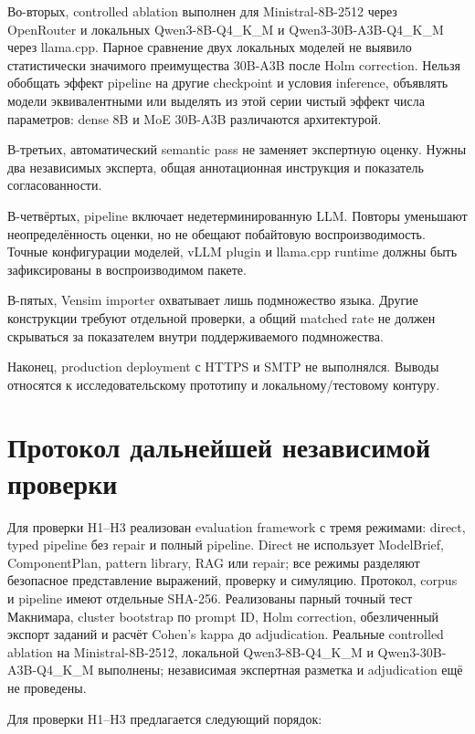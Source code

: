 Во-вторых, controlled ablation выполнен для Ministral-8B-2512 через OpenRouter и локальных Qwen3-8B-Q4\_K\_M и Qwen3-30B-A3B-Q4\_K\_M через llama.cpp. Парное сравнение двух локальных моделей не выявило статистически значимого преимущества 30B-A3B после Holm correction. Нельзя обобщать эффект pipeline на другие checkpoint и условия inference, объявлять модели эквивалентными или выделять из этой серии чистый эффект числа параметров: dense 8B и MoE 30B-A3B различаются архитектурой.

В-третьих, автоматический semantic pass не заменяет экспертную оценку. Нужны два независимых эксперта, общая аннотационная инструкция и показатель согласованности.

В-четвёртых, pipeline включает недетерминированную LLM. Повторы уменьшают неопределённость оценки, но не обещают побайтовую воспроизводимость. Точные конфигурации моделей, vLLM plugin и llama.cpp runtime должны быть зафиксированы в воспроизводимом пакете.

В-пятых, Vensim importer охватывает лишь подмножество языка. Другие конструкции требуют отдельной проверки, а общий matched rate не должен скрываться за показателем внутри поддерживаемого подмножества.

Наконец, production deployment с HTTPS и SMTP не выполнялся. Выводы относятся к исследовательскому прототипу и локальному/тестовому контуру.

\section{Протокол дальнейшей независимой проверки}

Для проверки H1--H3 реализован evaluation framework с тремя режимами: direct, typed pipeline без repair и полный pipeline. Direct не использует ModelBrief, ComponentPlan, pattern library, RAG или repair; все режимы разделяют безопасное представление выражений, проверку и симуляцию. Протокол, corpus и pipeline имеют отдельные SHA-256. Реализованы парный точный тест Макнимара, cluster bootstrap по prompt ID, Holm correction, обезличенный экспорт заданий и расчёт Cohen's kappa до adjudication. Реальные controlled ablation на Ministral-8B-2512, локальной Qwen3-8B-Q4\_K\_M и Qwen3-30B-A3B-Q4\_K\_M выполнены; независимая экспертная разметка и adjudication ещё не проведены.

Для проверки H1--H3 предлагается следующий порядок:


